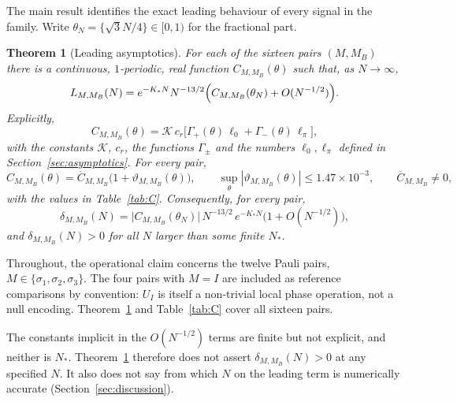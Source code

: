 \documentclass[11pt]{amsart}
\newtheorem{theorem}{Theorem}[section]
\theoremstyle{definition}
\theoremstyle{remark}
\newcommand{\cK}{\mathcal{K}}
\begin{document}
The main result identifies the exact leading behaviour of every signal in
the family.  Write $\theta_N=\{\sqrt3N/4\}\in[0,1)$ for the fractional part.

\begin{theorem}[Leading asymptotics]\label{thm:main}
For each of the sixteen pairs $(M,M_B)$ there is a continuous, $1$-periodic,
real function $C_{M,M_B}(\theta)$ such that, as $N\to\infty$,
\[
L_{M,M_B}(N)=e^{-K_*N}N^{-13/2}\Bigl(C_{M,M_B}(\theta_N)+O(N^{-1/2})\Bigr).
\]
Explicitly,
\begin{equation}\label{eq:C}
C_{M,M_B}(\theta)=\cK\,c_r\bigl[\Gamma_+(\theta)\,\ell_0+\Gamma_-(\theta)\,\ell_\pi\bigr],
\end{equation}
with the constants $\cK$, $c_r$, the functions $\Gamma_\pm$ and the numbers
$\ell_0,\ell_\pi$ defined in Section~\ref{sec:asymptotics}.  For every pair,
\[
C_{M,M_B}(\theta)=\overline C_{M,M_B}\bigl(1+\vartheta_{M,M_B}(\theta)\bigr),
\qquad \sup_\theta|\vartheta_{M,M_B}(\theta)|\le1.47\times10^{-3},
\qquad \overline C_{M,M_B}\ne0,
\]
with the values in Table~\ref{tab:C}.  Consequently, for every pair,
\[
\delta_{M,M_B}(N)=\bigl|C_{M,M_B}(\theta_N)\bigr|\,N^{-13/2}\,e^{-K_*N}\bigl(1+O(N^{-1/2})\bigr),
\]
and $\delta_{M,M_B}(N)>0$ for all $N$ larger than some finite $N_*$.
\end{theorem}

Throughout, the operational claim concerns the twelve Pauli pairs,
$M\in\{\sigma_1,\sigma_2,\sigma_3\}$.  The four pairs with $M=I$ are
included as reference comparisons by convention: $U_I$ is itself a
non-trivial local phase operation, not a null encoding. Theorem~\ref{thm:main} and
Table~\ref{tab:C} cover all sixteen pairs.

The constants implicit in the $O(N^{-1/2})$ terms are finite but not
explicit, and neither is $N_*$.  Theorem~\ref{thm:main} therefore does not
assert $\delta_{M,M_B}(N)>0$ at any specified $N$.  It also does not say from
which $N$ on the leading term is numerically accurate
(Section~\ref{sec:discussion}).
\end{document}
